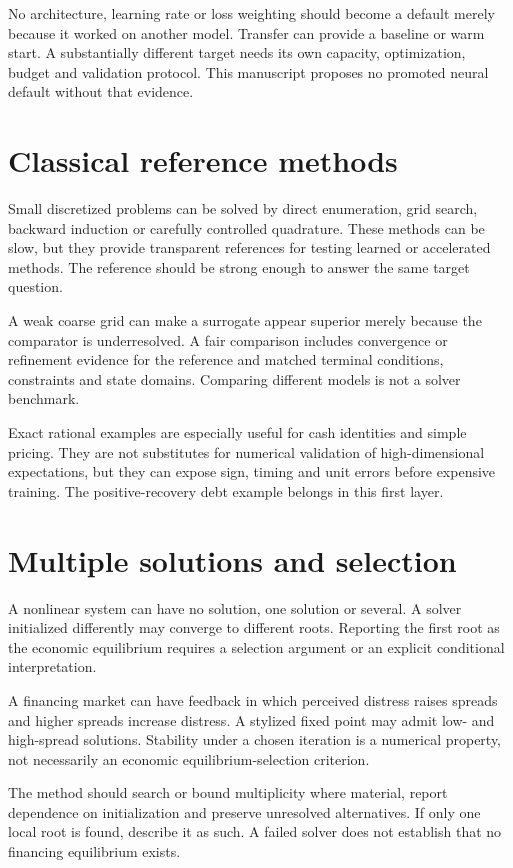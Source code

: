 No architecture, learning rate or loss weighting should become a default merely because it worked on another model. Transfer can provide a baseline or warm start. A substantially different target needs its own capacity, optimization, budget and validation protocol. This manuscript proposes no promoted neural default without that evidence.

\section{Classical reference methods}
Small discretized problems can be solved by direct enumeration, grid search, backward induction or carefully controlled quadrature. These methods can be slow, but they provide transparent references for testing learned or accelerated methods. The reference should be strong enough to answer the same target question.

A weak coarse grid can make a surrogate appear superior merely because the comparator is underresolved. A fair comparison includes convergence or refinement evidence for the reference and matched terminal conditions, constraints and state domains. Comparing different models is not a solver benchmark.

Exact rational examples are especially useful for cash identities and simple pricing. They are not substitutes for numerical validation of high-dimensional expectations, but they can expose sign, timing and unit errors before expensive training. The positive-recovery debt example belongs in this first layer.

\section{Multiple solutions and selection}
A nonlinear system can have no solution, one solution or several. A solver initialized differently may converge to different roots. Reporting the first root as the economic equilibrium requires a selection argument or an explicit conditional interpretation.

A financing market can have feedback in which perceived distress raises spreads and higher spreads increase distress. A stylized fixed point may admit low- and high-spread solutions. Stability under a chosen iteration is a numerical property, not necessarily an economic equilibrium-selection criterion.

The method should search or bound multiplicity where material, report dependence on initialization and preserve unresolved alternatives. If only one local root is found, describe it as such. A failed solver does not establish that no financing equilibrium exists.

